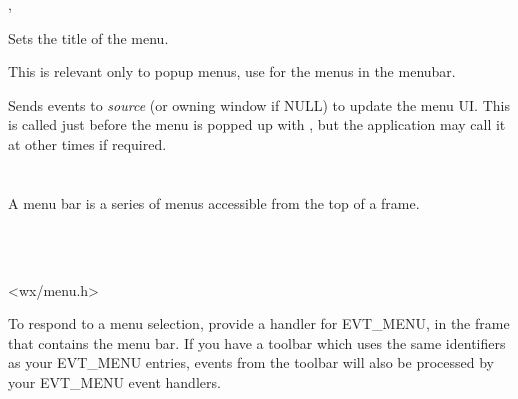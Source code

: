 

, 


\label{wxmenusettitle}


Sets the title of the menu.




This is relevant only to popup menus, use 
 for the menus in the
menubar.




\label{wxmenuupdateui}


Sends events to {\it source} (or owning window if NULL) to update the
menu UI. This is called just before the menu is popped up with , but
the application may call it at other times if required.



\section{}\label{wxmenubar}

A menu bar is a series of menus accessible from the top of a frame.


\\
\\


<wx/menu.h>


To respond to a menu selection, provide a handler for EVT\_MENU, in the frame
that contains the menu bar. If you have a toolbar which uses the same identifiers
as your EVT\_MENU entries, events from the toolbar will also be processed by your
EVT\_MENU event handlers.

